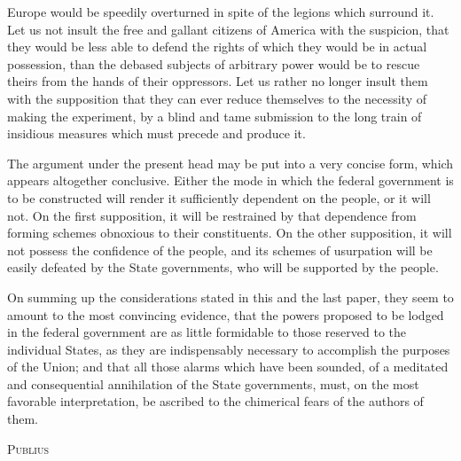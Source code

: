 Europe would be speedily overturned in spite of the legions which surround it. Let us not insult the free and gallant citizens of America with the suspicion, that they would be less able to defend the rights of which they would be in actual possession, than the debased subjects of arbitrary power would be to rescue theirs from the hands of their oppressors. Let us rather no longer insult them with the supposition that they can ever reduce themselves to the necessity of making the experiment, by a blind and tame submission to the long train of insidious measures which must precede and produce it.

The argument under the present head may be put into a very concise form, which appears altogether conclusive. Either the mode in which the federal government is to be constructed will render it sufficiently dependent on the people, or it will not. On the first supposition, it will be restrained by that dependence from forming schemes obnoxious to their constituents. On the other supposition, it will not possess the confidence of the people, and its schemes of usurpation will be easily defeated by the State governments, who will be supported by the people.

On summing up the considerations stated in this and the last paper, they seem to amount to the most convincing evidence, that the powers proposed to be lodged in the federal government are as little formidable to those reserved to the individual States, as they are indispensably necessary to accomplish the purposes of the Union; and that all those alarms which have been sounded, of a meditated and consequential annihilation of the State governments, must, on the most favorable interpretation, be ascribed to the chimerical fears of the authors of them.

\vspace{.5cm}
\textsc{Publius}

\vspace{1.5cm}

